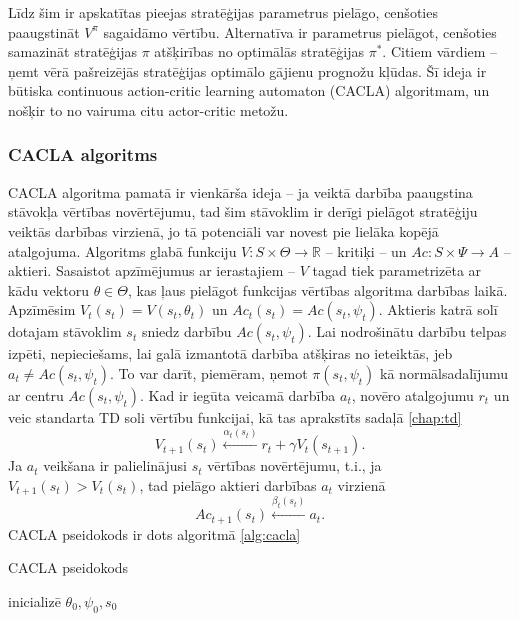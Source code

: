 \documentclass{ludis} %
\begin{document}
Līdz šim ir apskatītas pieejas stratēģijas parametrus pielāgo, cenšoties paaugstināt $V^\pi$ sagaidāmo vērtību.
Alternatīva ir parametrus pielāgot, cenšoties samazināt stratēģijas $\pi$ atšķirības no optimālās stratēģijas $\pi^*$.
Citiem vārdiem -- ņemt vērā pašreizējās stratēģijas optimālo gājienu prognožu kļūdas.
Šī ideja ir būtiska continuous action-critic learning automaton (CACLA) algoritmam, un nošķir to no vairuma citu actor-critic metožu.

\subsubsection{CACLA algoritms}
CACLA algoritma pamatā ir vienkārša ideja -- ja veiktā darbība paaugstina stāvokļa vērtības novērtējumu, tad šim stāvoklim ir derīgi pielāgot stratēģiju veiktās darbības virzienā, jo tā potenciāli var novest pie lielāka kopējā atalgojuma.
Algoritms glabā funkciju $V:S \times \Theta \rightarrow \mathbb{R}$ -- kritiķi -- un $Ac : S \times \Psi \rightarrow A$ -- aktieri. Sasaistot apzīmējumus ar ierastajiem -- $V$ tagad tiek parametrizēta ar kādu vektoru $\theta \in \Theta$, kas ļaus pielāgot funkcijas vērtības algoritma darbības laikā. Apzīmēsim $V_t(s_t) = V(s_t, \theta_t)$ un $Ac_t(s_t) = Ac(s_t, \psi_t)$.
Aktieris katrā solī dotajam stāvoklim $s_t$ sniedz darbību $Ac(s_t, \psi_t)$.
Lai nodrošinātu darbību telpas izpēti, nepieciešams, lai galā izmantotā darbība atšķiras no ieteiktās, jeb $a_t \neq Ac(s_t, \psi_t)$.
To var darīt, piemēram, ņemot $\pi(s_t, \psi_t)$ kā normālsadalījumu ar centru $Ac(s_t, \psi_t)$.
Kad ir iegūta veicamā darbība $a_t$, novēro atalgojumu $r_t$ un veic standarta TD soli vērtību funkcijai, kā tas aprakstīts sadaļā \ref{chap:td}
\[
	V_{t+1}(s_t) \xleftarrow{\alpha_t(s_t)} r_t + \gamma V_t(s_{t + 1}).
\]
Ja $a_t$ veikšana ir palielinājusi $s_t$ vērtības novērtējumu, t.i., ja $V_{t+1}(s_t) > V_t(s_t)$, tad pielāgo aktieri darbības $a_t$ virzienā
\[
	Ac_{t+1}(s_t) \xleftarrow{\beta_t(s_t)} a_t.
\]
CACLA pseidokods ir dots algoritmā \ref{alg:cacla}
\begin{spacing}{1}
\begin{algorithm}
\caption{CACLA pseidokods}\label{alg:cacla}
inicializē $\theta_0, \psi_0, s_0$ \\
\end{algorithm}
\end{spacing}
\end{document}
